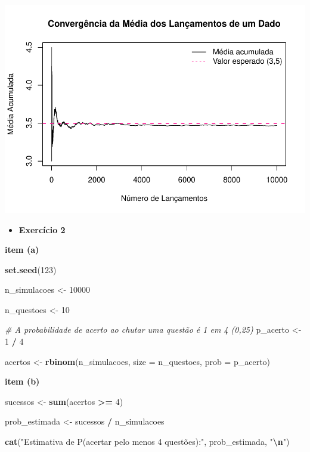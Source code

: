 \documentclass[
]{book}
\newenvironment{Shaded}{\begin{snugshade}}{\end{snugshade}}
\newcommand{\AttributeTok}[1]{\textcolor[rgb]{0.13,0.29,0.53}{#1}}
\newcommand{\CommentTok}[1]{\textcolor[rgb]{0.56,0.35,0.01}{\textit{#1}}}
\newcommand{\DecValTok}[1]{\textcolor[rgb]{0.00,0.00,0.81}{#1}}
\newcommand{\FunctionTok}[1]{\textcolor[rgb]{0.13,0.29,0.53}{\textbf{#1}}}
\newcommand{\NormalTok}[1]{#1}
\newcommand{\OtherTok}[1]{\textcolor[rgb]{0.56,0.35,0.01}{#1}}
\newcommand{\SpecialCharTok}[1]{\textcolor[rgb]{0.81,0.36,0.00}{\textbf{#1}}}
\newcommand{\StringTok}[1]{\textcolor[rgb]{0.31,0.60,0.02}{#1}}
\providecommand{\tightlist}{%
  \setlength{\itemsep}{0pt}\setlength{\parskip}{0pt}}
\begin{document}
\begin{center}\includegraphics{AED_files/figure-latex/cap9_ex1c-1} \end{center}

\begin{itemize}
\tightlist
\item
  \textbf{Exercício 2}
\end{itemize}

\textbf{item (a)}

\begin{Shaded}
\begin{Highlighting}[]
\FunctionTok{set.seed}\NormalTok{(}\DecValTok{123}\NormalTok{)}

\NormalTok{n\_simulacoes }\OtherTok{\textless{}{-}} \DecValTok{10000}

\NormalTok{n\_questoes }\OtherTok{\textless{}{-}} \DecValTok{10}

\CommentTok{\# A probabilidade de acerto ao chutar uma questão é 1 em 4 (0,25)}
\NormalTok{p\_acerto }\OtherTok{\textless{}{-}} \DecValTok{1} \SpecialCharTok{/} \DecValTok{4}

\NormalTok{acertos }\OtherTok{\textless{}{-}} \FunctionTok{rbinom}\NormalTok{(n\_simulacoes, }\AttributeTok{size =}\NormalTok{ n\_questoes, }\AttributeTok{prob =}\NormalTok{ p\_acerto)}
\end{Highlighting}
\end{Shaded}

\textbf{item (b)}

\begin{Shaded}
\begin{Highlighting}[]
\NormalTok{sucessos }\OtherTok{\textless{}{-}} \FunctionTok{sum}\NormalTok{(acertos }\SpecialCharTok{\textgreater{}=} \DecValTok{4}\NormalTok{)}

\NormalTok{prob\_estimada }\OtherTok{\textless{}{-}}\NormalTok{ sucessos }\SpecialCharTok{/}\NormalTok{ n\_simulacoes}

\FunctionTok{cat}\NormalTok{(}\StringTok{"Estimativa de P(acertar pelo menos 4 questões):"}\NormalTok{, prob\_estimada, }\StringTok{"}\SpecialCharTok{\textbackslash{}n}\StringTok{"}\NormalTok{)}
\end{Highlighting}
\end{Shaded}
\end{document}
